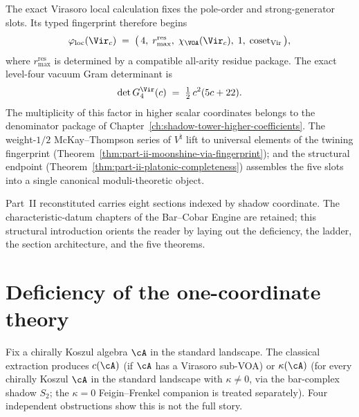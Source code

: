 The exact Virasoro local calculation fixes the pole-order and
strong-generator slots.  Its typed fingerprint therefore begins
\begin{equation}
 \varphi_{\mathrm{loc}}(\Vir_c) \;=\;
 \bigl(\,4,\; r_{\max}^{\mathrm{res}},\; \chi_{\VOA}(\Vir_c),\; 1,\;
 \mathrm{coset}_{\mathrm{Vir}}\,\bigr),
\end{equation}
where $r_{\max}^{\mathrm{res}}$ is determined by a compatible
all-arity residue package.  The exact level-four vacuum Gram
determinant is
\begin{equation}
 \det G^{\Vir}_{4}(c) \;=\; \tfrac{1}{2}\,c^2(5c + 22).
\end{equation}
The multiplicity of this factor in higher scalar coordinates belongs
to the denominator package of
Chapter~\ref{ch:shadow-tower-higher-coefficients}.  The weight-$1/2$
McKay--Thompson
series of $V^\natural$ lift to universal elements of the twining
fingerprint
(Theorem~\ref{thm:part-ii-moonshine-via-fingerprint}); and the
structural endpoint
(Theorem~\ref{thm:part-ii-platonic-completeness}) assembles the
five slots into a single canonical moduli-theoretic object.

\medskip

Part~II reconstituted carries eight sections indexed by shadow
coordinate. The characteristic-datum chapters of the Bar--Cobar Engine
are retained; this structural introduction orients the reader by
laying out the deficiency, the ladder, the section architecture,
and the five theorems.

\section{Deficiency of the one-coordinate theory}
\label{sec:part-ii-deficiency}

Fix a chirally Koszul algebra $\cA$ in the standard landscape.
The classical extraction produces $c(\cA)$ (if $\cA$ has a
Virasoro sub-VOA) or $\kappa(\cA)$ (for every chirally Koszul
$\cA$ in the standard landscape with $\kappa \ne 0$, via the
bar-complex shadow $S_2$; the $\kappa = 0$ Feigin--Frenkel
companion is treated separately). Four independent obstructions show
this is not the full story.

